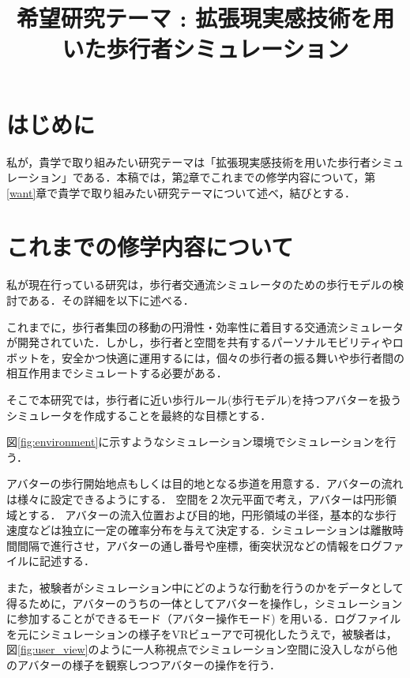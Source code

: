 \documentclass[twocolumn]{jarticle}%
\title{\vspace{5mm}\large{希望研究テーマ : 拡張現実感技術を用いた歩行者シミュレーション}\vspace{-15mm}}
\date{}
\begin{document}
\normalsize
\maketitle

\section{はじめに}
\thispagestyle{fancy}

私が，貴学で取り組みたい研究テーマは「拡張現実感技術を用いた歩行者シミュレーション」である．本稿では，第\ref{current}章でこれまでの修学内容について，第\ref{want}章で貴学で取り組みたい研究テーマについて述べ，結びとする．

\vspace{-2mm}
\section{これまでの修学内容について}\label{current}
私が現在行っている研究は，歩行者交通流シミュレータのための歩行モデルの検討である．その詳細を以下に述べる．

これまでに，歩行者集団の移動の円滑性・効率性に着目する交通流シミュレータが開発されていた．しかし，歩行者と空間を共有するパーソナルモビリティやロボットを，安全かつ快適に運用するには，個々の歩行者の振る舞いや歩行者間の相互作用までシミュレートする必要がある．

そこで本研究では，歩行者に近い歩行ルール(歩行モデル)を持つアバターを扱うシミュレータを作成することを最終的な目標とする．


図\ref{fig:environment}に示すようなシミュレーション環境でシミュレーションを行う．

アバターの歩行開始地点もしくは目的地となる歩道を用意する．アバターの流れは様々に設定できるようにする．
空間を２次元平面で考え，アバターは円形領域とする． アバターの流入位置および目的地，円形領域の半径，基本的な歩行速度などは独立に一定の確率分布を与えて決定する．シミュレーションは離散時間間隔で進行させ，アバターの通し番号や座標，衝突状況などの情報をログファイルに記述する． 

また，被験者がシミュレーション中にどのような行動を行うのかをデータとして得るために，アバターのうちの一体としてアバターを操作し，シミュレーションに参加することができるモード（アバター操作モード) を用いる．ログファイルを元にシミュレーションの様子をVRビューアで可視化したうえで，被験者は，図\ref{fig:user_view}のように一人称視点でシミュレーション空間に没入しながら他のアバターの様子を観察しつつアバターの操作を行う．
\end{document}
